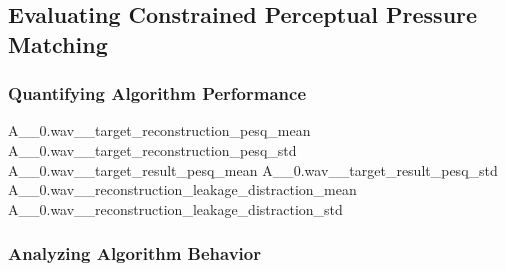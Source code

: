 \subsection{Evaluating Constrained Perceptual Pressure Matching}
\label{ch:results:results:constrained_results}

\subsubsection*{Quantifying Algorithm Performance}
\constrainingplot
{A__0.wav__target_reconstruction_pesq_mean}
{A__0.wav__target_reconstruction_pesq_std}
{A__0.wav__target_result_pesq_mean}
{A__0.wav__target_result_pesq_std}
{A__0.wav__reconstruction_leakage_distraction_mean}
{A__0.wav__reconstruction_leakage_distraction_std}

\subsubsection*{Analyzing Algorithm Behavior}

